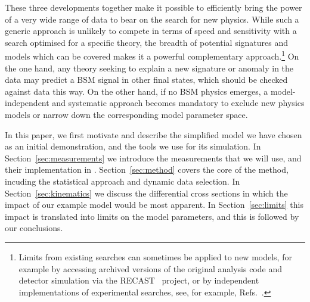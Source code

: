 \documentclass[floatfix]{article}
\begin{document}
These three developments together make it possible to efficiently 
bring the power of a very wide range of data to bear on the search for new physics. While such a generic approach is
unlikely to compete in terms of speed and sensitivity with a search optimised for a specific theory, the breadth
of potential signatures and models which can be covered makes it a powerful complementary approach.\footnote{Limits from existing 
searches can sometimes be applied to new models, for example by accessing archived versions of the original analysis code
and detector simulation via the RECAST~\cite{Cranmer:2010hk} project, or by independent implementations of experimental 
searches, see, for example, Refs.~\cite{Conte:2012fm,Drees:2013wra,Kraml:2013mwa,Papucci:2014rja,Barducci:2014ila}.} On the one hand, any theory seeking
to explain a new signature or anomaly in the data may predict a BSM signal in other final states, which should be checked 
against data this way. On the other hand, if no BSM physics emerges, a model-independent and systematic approach becomes mandatory to exclude 
new physics models or narrow down the corresponding model parameter space.

In this paper, we first motivate and describe the 
simplified model we have chosen as an initial demonstration, and the tools we use for its simulation.
In Section~\ref{sec:measurements} we introduce the measurements that we will use, and their implementation in \rivet. 
Section~\ref{sec:method} covers the core of the \Contur method, incuding the statistical approach and dynamic data selection.
In Section~\ref{sec:kinematics} we discuss the differential cross sections in which the impact of our example model would be 
most apparent. In Section~\ref{sec:limits} this impact is translated into limits on the model parameters, and this is followed by our conclusions.
\end{document}
